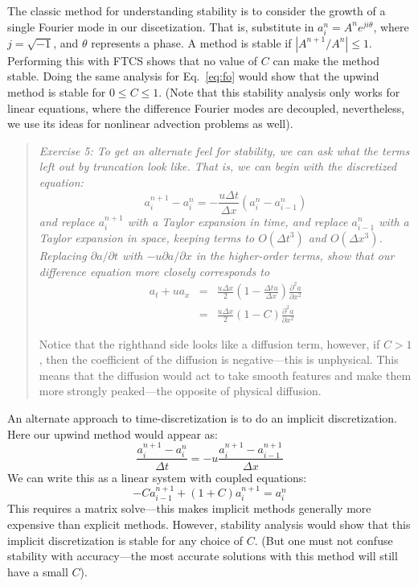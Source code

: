 \documentclass[11pt]{article}
\begin{document}
The classic method for understanding stability is to consider the growth 
of a single Fourier mode in our discetization.  That is, substitute in
$a_i^n = A^n e^{ji\theta}$, where $j = \sqrt{-1}$, and $\theta$ represents a
phase.  A method is stable if $|A^{n+1}/A^n| \le 1$.  Performing this
with FTCS shows that no value of $C$ can make the method stable.
Doing the same analysis for Eq.~\ref{eq:fo} would show that the upwind
method is stable for $0\le C \le 1$. 
(Note that this stability analysis only works for linear equations, where
the difference Fourier modes are decoupled, nevertheless, we use its
ideas for nonlinear advection problems as well).

\begin{quote}
{\em Exercise 5: To get an alternate feel for stability, we can ask
  what the terms left out by truncation look like.  That is, we can
  begin with the discretized equation:
\begin{equation}
  a_i^{n+1} - a_i^n = -\frac{u \Delta t}{\Delta x} ( a_i^n - a_{i-1}^n )
\end{equation}
and replace $a_i^{n+1}$ with a Taylor expansion in time, and replace
$a_{i-1}^n$ with a Taylor expansion in space, keeping terms to
$O(\Delta t^3)$ and $O(\Delta x^3)$.  Replacing $\partial a/\partial t$
with $-u \partial a/ \partial x$ in the higher-order terms, show 
that our difference equation more closely corresponds to 
\begin{eqnarray}
a_t + u a_x &=& \frac{u \Delta x}{2} \left ( 1 - \frac{\Delta t u}{\Delta x} \right ) \frac{\partial^2 a}{\partial x^2} \\
            &=& \frac{u \Delta x}{2} (1 - C) \frac{\partial^2 a}{\partial x^2}
\end{eqnarray}

Notice that the righthand side looks like a diffusion term, however,
if $C > 1$, then the coefficient of the diffusion is negative---this is
unphysical.  This means that the diffusion would act to take smooth
features and make them more strongly peaked---the opposite of physical
diffusion.

}
\end{quote}

An alternate approach to time-discretization is to do an implicit
discretization.  Here our upwind method would appear as:
\begin{equation}
\frac{a^{n+1}_i - a^n_i}{\Delta t} = -u \frac{a^{n+1}_i - a^{n+1}_{i-1}}{\Delta x}
\end{equation}
We can write this as a linear system with coupled equations:
\begin{equation}
-C a^{n+1}_{i-1} + (1 + C) a^{n+1}_i = a_i^n
\end{equation}
This requires a matrix solve---this makes implicit methods generally more
expensive than explicit methods.  However, stability analysis would show
that this implicit discretization is stable for any choice of $C$. (But
one must not confuse stability with accuracy---the most accurate solutions
with this method will still have a small $C$).
\end{document}
